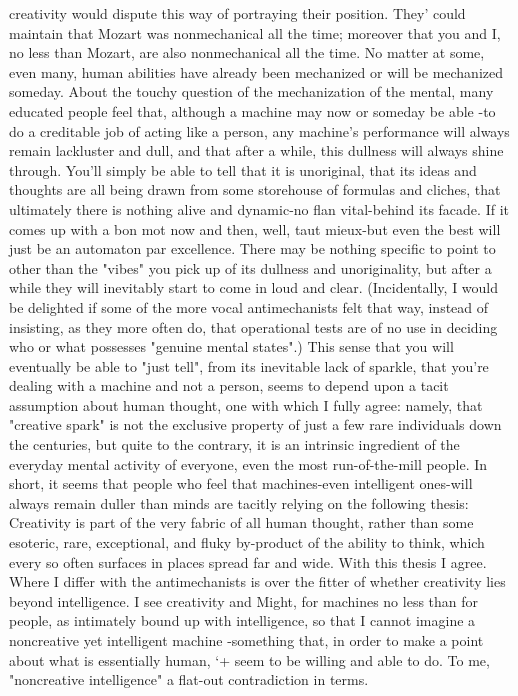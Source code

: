 creativity would dispute this way of portraying their position. They' could maintain
that Mozart was nonmechanical all the time; moreover that you and I, no less than
Mozart, are also nonmechanical all the time. No matter at some, even many, human
abilities have already been mechanized or will be mechanized someday.
        About the touchy question of the mechanization of the mental, many educated
people feel that, although a machine may now or someday be able -to do a creditable
job of acting like a person, any machine's performance will always remain lackluster
and dull, and that after a while, this dullness will always shine through. You'll simply
be able to tell that it is unoriginal, that its ideas and thoughts are all being drawn from
some storehouse of formulas and cliches, that ultimately there is nothing alive and
dynamic-no flan vital-behind its facade. If it comes up with a bon mot now and then,
well, taut mieux-but even the best will just be an automaton par excellence. There
may be nothing specific to point to other than the "vibes" you pick up of its dullness
and unoriginality, but after a while they will inevitably start to come in loud and clear.
(Incidentally, I would be delighted if some of the more vocal antimechanists felt that
way, instead of insisting, as they more often do, that operational tests are of no use in
deciding who or what possesses "genuine mental states".)
        This sense that you will eventually be able to "just tell", from its inevitable
lack of sparkle, that you're dealing with a machine and not a person, seems to depend
upon a tacit assumption about human thought, one with which
I fully agree: namely, that "creative spark" is not the exclusive property of just a few
rare individuals down the centuries, but quite to the contrary, it
is an intrinsic ingredient of the everyday mental activity of everyone, even the most
run-of-the-mill people. In short, it seems that people who feel that machines-even
intelligent ones-will always remain duller than minds are tacitly relying on the
following thesis: Creativity is part of the very fabric of all human thought, rather than
some esoteric, rare, exceptional, and fluky by-product of the ability to think, which
every so often surfaces in places spread far and wide.
        With this thesis I agree. Where I differ with the antimechanists is over the
fitter of whether creativity lies beyond intelligence. I see creativity and Might, for
machines no less than for people, as intimately bound up with intelligence, so that I
cannot imagine a noncreative yet intelligent machine -something that, in order to
make a point about what is essentially human, `+ seem to be willing and able to do.
To me, "noncreative intelligence" a flat-out contradiction in terms.


